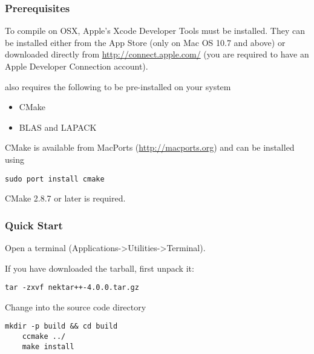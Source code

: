 \subsubsection{Prerequisites}
To compile \nekpp on OSX, Apple's Xcode Developer Tools must be installed. They
can be installed either from the App Store (only on Mac OS 10.7 and above) or
downloaded directly from
\href{http://connect.apple.com/}{http://connect.apple.com/} 
(you are required to have an Apple Developer Connection account).

\nekpp also requires the following to be pre-installed on your system
\begin{itemize}
    \item CMake
    \item BLAS and LAPACK
\end{itemize}
CMake is available from MacPorts (\url{http://macports.org}) and can be
installed using
\begin{lstlisting}[style=BashInputStyle]
sudo port install cmake
\end{lstlisting}

\begin{notebox}
CMake 2.8.7 or later is required.
\end{notebox}

\subsubsection{Quick Start}
Open a terminal (Applications->Utilities->Terminal).

If you have downloaded the tarball, first unpack it:
\begin{lstlisting}[style=BashInputStyle]
    tar -zxvf nektar++-4.0.0.tar.gz
\end{lstlisting}
Change into the  source code directory
\begin{lstlisting}[style=BashInputStyle]
    mkdir -p build && cd build 
    ccmake ../
    make install
\end{lstlisting}

